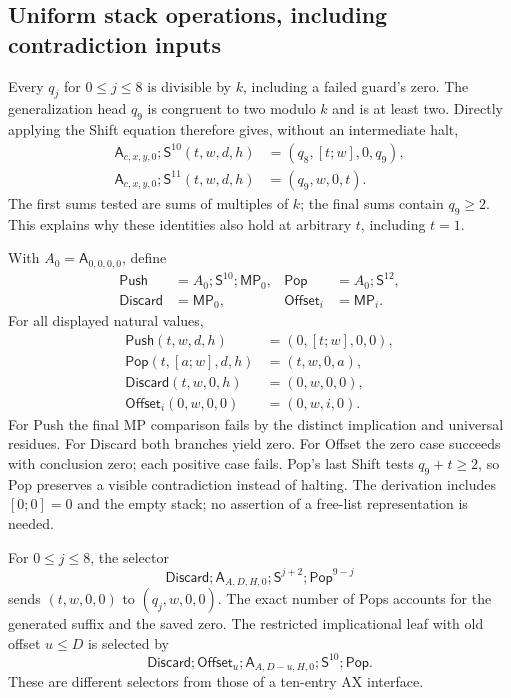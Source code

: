\subsection{Uniform stack operations, including contradiction inputs}

Every $q_j$ for $0\leq j\leq8$ is divisible by $k$, including a failed
guard's zero.  The generalization head $q_9$ is congruent to two modulo
$k$ and is at least two.  Directly applying the Shift equation therefore
gives, without an intermediate halt,
\begin{align*}
 \mathsf A_{c,x,y,0};\mathsf S^{10}(t,w,d,h)
   &=(q_8,[t;w],0,q_9),\\
 \mathsf A_{c,x,y,0};\mathsf S^{11}(t,w,d,h)
   &=(q_9,w,0,t).
\end{align*}
The first sums tested are sums of multiples of $k$; the final sums contain
$q_9\geq2$.  This explains why these identities also hold at arbitrary
$t$, including $t=1$.

With $A_0=\mathsf A_{0,0,0,0}$, define
\[
 \begin{aligned}
  \mathsf{Push}&=A_0;\mathsf S^{10};\mathsf{MP}_0,&
  \mathsf{Pop}&=A_0;\mathsf S^{12},\\
  \mathsf{Discard}&=\mathsf{MP}_0,&
  \mathsf{Offset}_i&=\mathsf{MP}_i.
 \end{aligned}
\]
For all displayed natural values,
\begin{align*}
 \mathsf{Push}(t,w,d,h)&=(0,[t;w],0,0),\\
 \mathsf{Pop}(t,[a;w],d,h)&=(t,w,0,a),\\
 \mathsf{Discard}(t,w,0,h)&=(0,w,0,0),\\
 \mathsf{Offset}_i(0,w,0,0)&=(0,w,i,0).
\end{align*}
For Push the final MP comparison fails by the distinct implication and
universal residues.  For Discard both branches yield zero.  For Offset the
zero case succeeds with conclusion zero; each positive case fails.
Pop's last Shift tests $q_9+t\geq2$, so Pop preserves a visible
contradiction instead of halting.  The derivation includes $[0;0]=0$ and
the empty stack; no assertion of a free-list representation is needed.

For $0\leq j\leq8$, the selector
\[
 \mathsf{Discard};\mathsf A_{A,D,H,0};
       \mathsf S^{j+2};\mathsf{Pop}^{9-j}                 \tag{Sel}
\]
sends $(t,w,0,0)$ to $(q_j,w,0,0)$.  The exact number of Pops accounts for
the generated suffix and the saved zero.  The restricted implicational
leaf with old offset $u\leq D$ is selected by
\[
 \mathsf{Discard};\mathsf{Offset}_u;
 \mathsf A_{A,D-u,H,0};\mathsf S^{10};\mathsf{Pop}.
\]
These are different selectors from those of a ten-entry AX interface.


